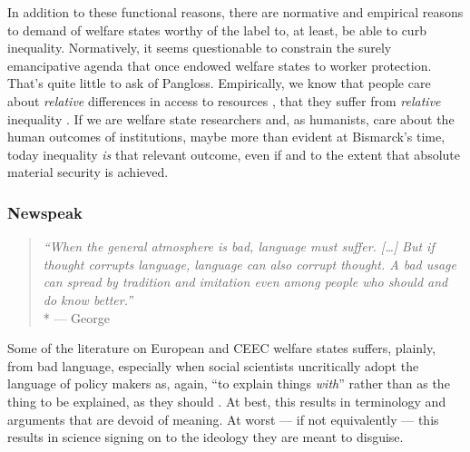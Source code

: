 \begin{enumerate}
	In addition to these functional reasons, there are normative and empirical reasons to demand of welfare states worthy of the label to, at least, be able to curb inequality.
Normatively, it seems questionable to constrain the surely emancipative agenda that once endowed welfare states to worker protection.
That's quite little to ask of Pangloss.
Empirically, we know that people care about \emph{relative} differences in access to resources \citep{Frank2005}, that they suffer from \emph{relative} inequality \citep{Pickett-2009-kx}.
If we are welfare state researchers and, as humanists, care about the human outcomes of institutions, maybe more than evident at Bismarck's time, today inequality \emph{is} that relevant outcome, even if and to the extent that absolute material security is achieved.
\end{enumerate}

\subsubsection[Newspeak]{Newspeak} \label{sec:newspeak}

\begin{quote}
	\emph{``When the general atmosphere is bad, language must suffer.
	[\ldots]
	But if thought corrupts language, language can also corrupt thought.
	A bad usage can spread by tradition and imitation even among people who should and do know better.''}
	\\*
	--- George \citet{Orwell1946}
\end{quote}

Some of the literature on European and \gls{CEEC} welfare states suffers, plainly, from bad language, especially when social scientists uncritically adopt the language of policy makers as, again, ``to explain things \emph{with}'' rather than as the thing to be explained, as they should \citep{Brubaker-2002-aa}.
At best, this results in terminology and arguments that are devoid of meaning.
At worst --- if not equivalently --- this results in science signing on to the ideology they are meant to disguise.



